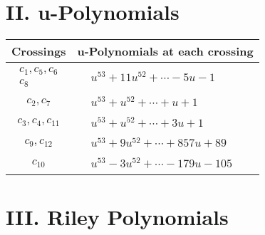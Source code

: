 \documentclass[1p]{elsarticle_modified}
\theoremstyle{definition}
\begin{document}
\newpage\renewcommand{\arraystretch}{1}
\centering \section*{ II. u-Polynomials}
\begin{tabular}{m{50pt}|m{274pt}}
Crossings & \hspace{64pt}u-Polynomials at each crossing \\
\hline $$\begin{aligned}c_{1},c_{5},c_{6}\\c_{8}\end{aligned}$$&$\begin{aligned}
&u^{53}+11 u^{52}+\cdots-5 u-1
\end{aligned}$\\
\hline $$\begin{aligned}c_{2},c_{7}\end{aligned}$$&$\begin{aligned}
&u^{53}+u^{52}+\cdots+u+1
\end{aligned}$\\
\hline $$\begin{aligned}c_{3},c_{4},c_{11}\end{aligned}$$&$\begin{aligned}
&u^{53}+u^{52}+\cdots+3 u+1
\end{aligned}$\\
\hline $$\begin{aligned}c_{9},c_{12}\end{aligned}$$&$\begin{aligned}
&u^{53}+9 u^{52}+\cdots+857 u+89
\end{aligned}$\\
\hline $$\begin{aligned}c_{10}\end{aligned}$$&$\begin{aligned}
&u^{53}-3 u^{52}+\cdots-179 u-105
\end{aligned}$\\
\hline
\end{tabular}\newpage\renewcommand{\arraystretch}{1}
\centering \section*{ III. Riley Polynomials}
\end{document}
